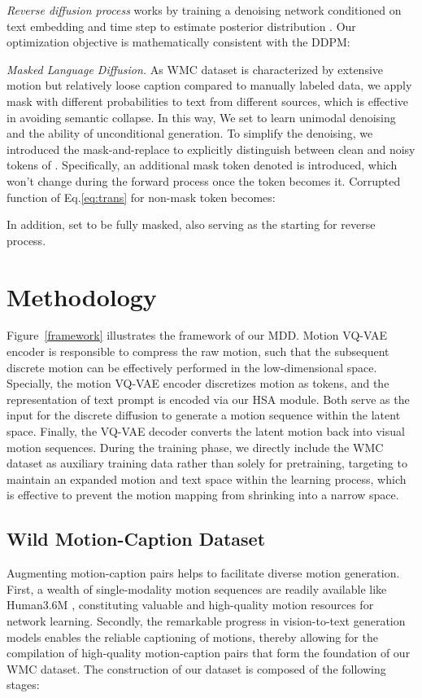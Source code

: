 \documentclass[letterpaper]{article} \usepackage{aaai24}
\begin{document}
\textit{Reverse diffusion process} works by training a denoising network  conditioned on text embedding  and time step  to estimate posterior distribution . Our optimization objective  is mathematically consistent with the DDPM:



\textit{Masked Language Diffusion.} As WMC dataset is characterized by extensive motion but relatively loose caption compared to manually labeled data, we apply mask with different probabilities  to text from different sources, which is effective in avoiding semantic collapse. In this way, We set  to learn unimodal denoising and the ability of unconditional generation. To simplify the denoising, we introduced the mask-and-replace \cite{gu2022vector} to explicitly distinguish between clean and noisy tokens of . Specifically, an additional mask token denoted  is introduced, which won't change during the forward process once the token becomes it. Corrupted function of Eq.\ref{eq:trans} for non-mask token  becomes:

In addition,  set to be fully masked, also serving as the starting for reverse process.



\section{Methodology}




Figure~\ref{framework} illustrates the framework of our MDD. Motion VQ-VAE encoder
is responsible to compress the raw motion, such that the subsequent discrete motion can be effectively performed in the low-dimensional space.  Specially, 
the motion VQ-VAE encoder discretizes motion as tokens, and the representation of text prompt is encoded via our HSA module. Both serve as the input for the discrete diffusion  to generate a motion sequence within the latent space. Finally, the VQ-VAE decoder converts the latent motion back into visual motion sequences.
During the training phase,  we directly include the WMC dataset as auxiliary training data rather than solely for pretraining, targeting to maintain an expanded motion and text space within the learning process, which is effective to  prevent the motion mapping from shrinking into a narrow space. 






\subsection{Wild Motion-Caption Dataset}
Augmenting motion-caption pairs helps to facilitate diverse motion generation.
First, a wealth of single-modality motion sequences are readily available like Human3.6M \cite{h36m_pami}, constituting valuable and high-quality motion resources for network learning. Secondly, the remarkable progress in vision-to-text generation models enables the reliable captioning of motions, thereby allowing for the compilation of high-quality motion-caption pairs that form the foundation of our WMC dataset. The construction of our dataset is composed of the following stages:
\end{document}
